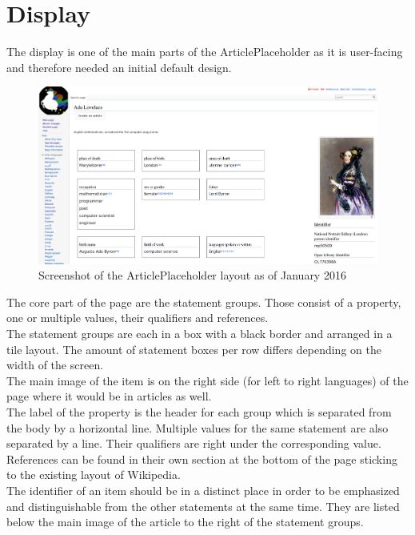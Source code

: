 \section{Display}
	The display is one of the main parts of the ArticlePlaceholder as it is user-facing and therefore needed an initial default design. \\
	\begin{figure}[H]
		\centering
		\includegraphics[width=\textwidth]{diagrams/Screenshot-ArticlePlaceholder.png}
		\caption{Screenshot of the ArticlePlaceholder layout as of January 2016}
		\label{screenshot}
	\end{figure}
	The core part of the page are the statement groups. Those consist of a property, one or multiple values, their qualifiers and references. \\
	The statement groups are each in a box with a black border and arranged in a tile layout. The amount of statement boxes per row differs depending on the width of the screen. \\
	The main image of the item is on the right side (for left to right languages) of the page where it would be in articles as well.\\
	The label of the property is the header for each group which is separated from the body by a horizontal line. Multiple values for the same statement are also separated by a line. Their qualifiers are right under the corresponding value. \\
	References can be found in their own section at the bottom of the page sticking to the existing layout of Wikipedia. \\
	The identifier of an item should be in a distinct place in order to be emphasized and distinguishable from the other statements at the same time. They are listed below the main image of the article to the right of the statement groups.
	
	
	
	
	